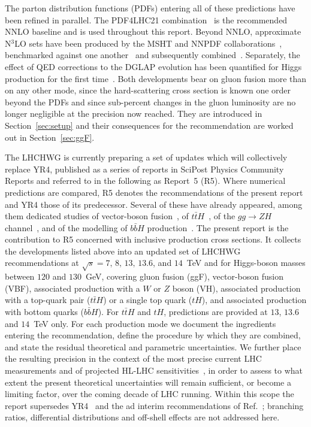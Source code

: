 The parton distribution functions (PDFs) entering all of these
predictions have been refined in parallel. The PDF4LHC21
combination~\cite{PDF4LHCWorkingGroup:2022cjn} is the recommended NNLO
baseline and is used throughout this report. Beyond NNLO, approximate
N$^3$LO sets have been produced by the MSHT and NNPDF
collaborations~\cite{McGowan:2022nag,NNPDF:2024nan}, benchmarked
against one another~\cite{Cooper-Sarkar:2024crx} and subsequently
combined~\cite{Cridge:2024icl}. Separately, the effect of QED
corrections to the DGLAP evolution has been quantified for Higgs
production for the first time~\cite{Manohar:2016nzj,Cooper-Sarkar:2025sqw}.
Both developments bear on gluon fusion more than on any other mode,
since the hard-scattering cross section is known one order beyond the
PDFs and since sub-percent changes in the gluon luminosity are no
longer negligible at the precision now reached. They are introduced in
Section~\ref{sec:setup} and their consequences for the recommendation
are worked out in Section~\ref{sec:ggF}.

The LHCHWG is currently preparing a set of updates which will
collectively replace YR4, published as a series of reports in SciPost
Physics Community Reports and referred to in the following as Report~5
(R5). Where numerical predictions are compared, R5 denotes the recommendations
of the present report and YR4 those of its predecessor. Several of these have already appeared, among them dedicated
studies of vector-boson fusion~\cite{Barone:2025jey}, of
$t\bar{t}H$~\cite{Balsach:2025jcw}, of the $gg\to ZH$
channel~\cite{CampilloAveleira:2025rbh}, and of the modelling of
$b\bar{b}H$ production~\cite{10.21468/SciPostPhysCommRep.18}. The
present report is the contribution to R5 concerned with inclusive
production cross sections. It collects the developments listed above
into an updated set of LHCHWG recommendations at
$\sqrt{s}=7,\,8,\,13,\,13.6$, and $14$~TeV and for Higgs-boson masses
between $120$ and $130$~GeV, covering gluon fusion (ggF), vector-boson
fusion (VBF), associated production with a $W$ or $Z$ boson (VH),
associated production with a top-quark pair ($t\bar{t}H$) or a single
top quark ($tH$), and associated production with bottom quarks
($b\bar{b}H$). For $t\bar{t}H$ and $tH$, predictions are provided at
$13$, $13.6$ and $14$~TeV only. For each production mode we document
the ingredients entering the recommendation, define the procedure by
which they are combined, and state the residual theoretical and
parametric uncertainties. We further place the resulting precision in
the context of the most precise current LHC measurements and of
projected HL-LHC
sensitivities~\cite{Cepeda:2019klc,ATLAS:2022hsp}, in order to assess
to what extent the present theoretical uncertainties will remain
sufficient, or become a limiting factor, over the coming decade of LHC
running. Within this scope the report supersedes
YR4~\cite{LHCHiggsCrossSectionWorkingGroup:2016ypw} and the ad interim
recommendations of Ref.~\cite{Karlberg:2024zxx}; branching ratios,
differential distributions and off-shell effects are not addressed
here.

